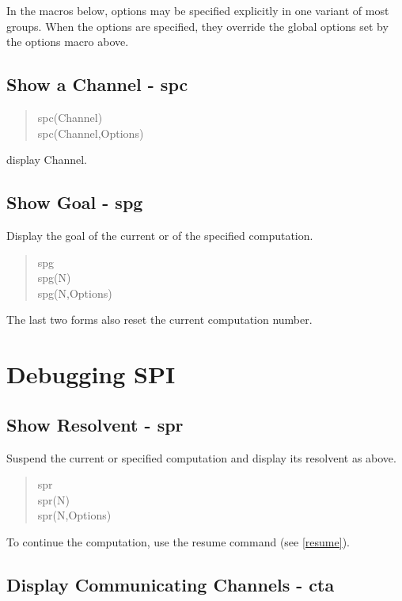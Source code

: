\noindent
In the macros below, options may be specified explicitly in one variant
of most groups.  When the options are specified, they override the
global options set by the options macro above.

\subsection{Show a Channel - spc}

\begin{verse}
    spc(Channel) \\
    spc(Channel,Options)
\end{verse}

\noindent
display Channel.

\subsection{Show Goal - spg}

Display the goal of the current or of the specified computation.

\begin{verse}
   spg \\
   spg(N) \\
   spg(N,Options)
\end{verse}

\noindent
The last two forms also reset the current computation number.

\section{Debugging SPI}

\subsection{Show Resolvent - spr}
\label{spr}

Suspend the current or specified computation and display its resolvent
as above.

\begin{verse}
   spr \\
   spr(N) \\
   spr(N,Options)
\end{verse}

\noindent
To continue the computation, use the resume command
(see \ref{resume}).

\subsection{Display Communicating Channels - cta}
\label{cta}

